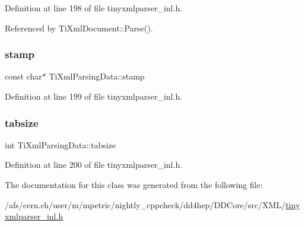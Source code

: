 Definition at line 198 of file tinyxmlparser\+\_\+inl.\+h.



Referenced by Ti\+Xml\+Document\+::\+Parse().

\hypertarget{class_ti_xml_parsing_data_a0e3c2ea5a8b738d733735ca0318fe4ff}{}\label{class_ti_xml_parsing_data_a0e3c2ea5a8b738d733735ca0318fe4ff} 
\subsubsection{\texorpdfstring{stamp}{stamp}}
{\footnotesize\ttfamily const char$\ast$ Ti\+Xml\+Parsing\+Data\+::stamp\hspace{0.3cm}{\ttfamily [private]}}



Definition at line 199 of file tinyxmlparser\+\_\+inl.\+h.

\hypertarget{class_ti_xml_parsing_data_ab9d6aea2833e38aaef440e49c22a05ca}{}\label{class_ti_xml_parsing_data_ab9d6aea2833e38aaef440e49c22a05ca} 
\subsubsection{\texorpdfstring{tabsize}{tabsize}}
{\footnotesize\ttfamily int Ti\+Xml\+Parsing\+Data\+::tabsize\hspace{0.3cm}{\ttfamily [private]}}



Definition at line 200 of file tinyxmlparser\+\_\+inl.\+h.



The documentation for this class was generated from the following file\+:\begin{DoxyCompactItemize}
\item 
/afs/cern.\+ch/user/m/mpetric/nightly\+\_\+cppcheck/dd4hep/\+D\+D\+Core/src/\+X\+M\+L/\hyperlink{tinyxmlparser__inl_8h}{tinyxmlparser\+\_\+inl.\+h}\end{DoxyCompactItemize}
